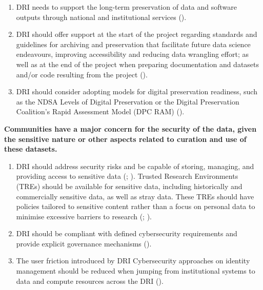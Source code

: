 \documentclass[11pt]{scrartcl}
\begin{document}
\begin{enumerate}[resume]
\item DRI needs to support the long-term preservation of data and software outputs through national and institutional services (\cite[8]{
beavan_2025b_15083632}).

\item DRI should offer support at the start of the project regarding standards and guidelines for archiving and preservation that facilitate future data science endeavours, improving accessibility and reducing data wrangling effort; as well as at the end of the project when preparing documentation and datasets and/or code resulting from the project (\cite[4,18]{de_roure_2022_4716148}).

\item DRI should consider adopting models for digital preservation readiness, such as the NDSA Levels of Digital Preservation or the Digital Preservation Coalition's Rapid Assessment Model (DPC RAM) (\cite[4,21]{Zwiggelaar22}).  
\end{enumerate}

\noindent\textbf{Communities have a major concern for the security of the data, given the sensitive nature or other aspects related to curation and use of these datasets.} 

\begin{enumerate}[resume]
\item\label{itm:sec} DRI should address security risks and be capable of storing, managing, and providing access to sensitive data 
(\cite{de_roure_2022_4716148}; \cite[5]{wrro203045}). Trusted Research Environments (TREs) should be available for sensitive data, including historically and commercially sensitive data, as well as stray data. These TREs should have policies tailored to sensitive content rather than a focus on personal data to minimise excessive barriers to research 
(\cite[4]{de_roure_2022_4716148}; \cite[5]{Zwiggelaar22}).

\item\label{itm:cyb} DRI should be compliant with defined cybersecurity requirements and provide explicit governance mechanisms (\cite[5,6]{collier25}).  


\item The user friction introduced by DRI Cybersecurity approaches on identity management should be reduced when jumping from institutional systems to data and compute resources across the DRI (\cite[21]{collier25}).  
\end{enumerate}
\end{document}
